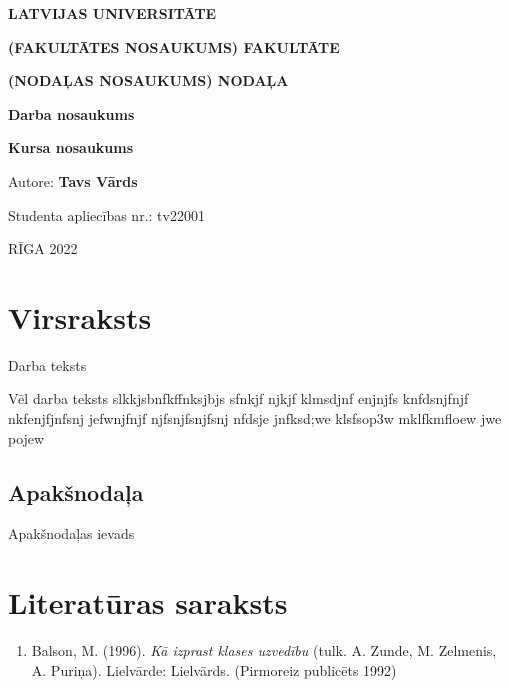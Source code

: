 \documentclass[12pt]{article}
\begin{document}
	
	\begin{titlepage}
		\thispagestyle{empty}
		\begin{center}
			\vspace*{2cm}
			\begin{large}\textbf{LATVIJAS UNIVERSITĀTE}
				
				\textbf{(FAKULTĀTES NOSAUKUMS) FAKULTĀTE}
				
				\vspace{1cm}
				\textbf{(NODAĻAS NOSAUKUMS) NODAĻA}
				
				\vfill
				\textbf{Darba nosaukums}
			\end{large}
			
			\vfill
			\textbf{Kursa nosaukums}
		\end{center}
		\vspace{4cm}
		\begin{flushright}
			Autore: \textbf{Tavs Vārds}
			
			Studenta apliecības nr.: tv22001

		\end{flushright}
		\vspace{1cm}
		\begin{center}
			RĪGA 2022
		\end{center}
	\end{titlepage}
	
	\tableofcontents
	
	\pagebreak
	\section{Virsraksts}
	Darba teksts
	
	Vēl darba teksts slkkjsbnfkffnksjbjs sfnkjf njkjf klmsdjnf enjnjfs knfdsnjfnjf nkfenjfjnfsnj jefwnjfnjf njfsnjfsnjfsnj nfdsje jnfksd;we klsfsop3w mklfkmfloew jwe pojew
	
	\subsection{Apakšnodaļa}
	Apakšnodaļas ievads
	
	\pagebreak
	\section*{Literatūras saraksts}
	\begin{enumerate}
		\item Balson, M. (1996). \emph{Kā izprast klases uzvedību} (tulk. A. Zunde, M. Zelmenis, A. Puriņa). Lielvārde: Lielvārds. (Pirmoreiz publicēts 1992)
	\end{enumerate}
	
\end{document}
